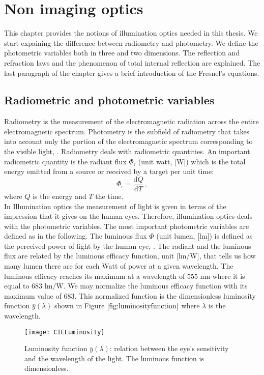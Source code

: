 \chapter{Non imaging optics}
This chapter provides the notions of illumination optics needed in this thesis. We start expaining the difference between radiometry and photometry.
We define the photometric variables  both in three and two dimensions. The reflection and refraction laws and the phenomenon of total internal reflection are explained. The last paragraph of the chapter gives a brief introduction of the Fresnel's equations. 
\section{Radiometric and photometric variables}
Radiometry is the measurement of the electromagnetic radiation across the entire electromagnetic spectrum. Photometry is the subfield of radiometry that takes into account only the portion of the electromagnetic spectrum corresponding to the visible light, \cite{zalewski1995radiometry}. Radiometry  deals with radiometric quantities. An important radiometric quantity  is the radiant flux $\Phi_{\textrm{r}}$ (unit watt, [\textrm{W}]) which is the total energy emitted from a source or received by a target per unit time:
\begin{equation}
\Phi_{\textrm{r}} = \frac{\textrm{d}Q}{\textrm{d}T}\,,
\end{equation}
where $Q$ is the energy and $T$ the time.\\
\indent In Illumination optics the measurement of light is given in terms of the impression that it gives on the human eyes. Therefore, illumination optics deals with the photometric variables. The most important photometric variables are defined as in the following. The luminous flux $\Phi$ (unit lumen, [\textrm{lm}]) is defined as the perceived power of light by the human eye, \cite{chaves2015introduction}.
 The radiant and the luminous flux are related by the luminous efficacy function, unit [lm/W], that tells us how many lumen there are for each Watt of power at a given wavelength.
 The luminous efficacy reaches its maximum  at a wavelength of $555$ $\textrm{nm}$ where it is equal to $683$ $\textrm{lm}/\textrm{W}$.
  We may normalize the luminous efficacy function with its maximum value of $683$.
  This normalized function is the dimensionless luminosity function $\bar{y}(\lambda)$ shown in Figure $\ref{fig:luminosityfunction}$ where $\lambda$ is the wavelength.
\begin{figure}[h]
  \begin{center}
  \texttt{[image: CIELuminosity]}
  \end{center}
  \caption{Luminosity function $\bar{y}(\lambda)$: relation between the eye's sensitivity and the wavelength of the light. The luminous function is dimensionless.}
  \label{fig:luminosityfunction}
  \end{figure}
